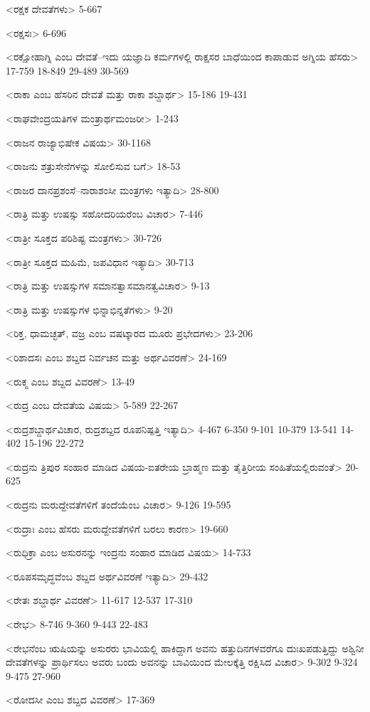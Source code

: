 <ರಕ್ಷಕ ದೇವತೆಗಳು>
5-667

<ರಕ್ಷಸಃ>
6-696

<ರಕ್ಷೋಹಾಗ್ನಿ ಎಂಬ ದೇವತೆ–ಇದು ಯಜ್ಞಾದಿ ಕರ್ಮಗಳಲ್ಲಿ ರಾಕ್ಷಸರ ಬಾಧೆಯಿಂದ ಕಾಪಾಡುವ ಅಗ್ನಿಯ ಹೆಸರು>
17-759 
18-849
29-489
30-569

<ರಾಕಾ ಎಂಬ ಹೆಸರಿನ ದೇವತೆ ಮತ್ತು ರಾಕಾ ಶಬ್ದಾರ್ಥ>
15-186
19-431

<ರಾಘವೇಂದ್ರಯತಿಗಳ ಮಂತ್ರಾರ್ಥಮಂಜರೀ>
1-243

<ರಾಜನ ರಾಜ್ಯಾಭಿಷೇಕ ವಿಷಯ>
30-1168

<ರಾಜನು ಶತ್ರುಸೇನೆಗಳನ್ನು ಸೋಲಿಸುವ ಬಗೆ>
18-53

<ರಾಜರ ದಾನಪ್ರಶಂಸೆ–ನಾರಾಶಂಸೀ ಮಂತ್ರಗಳು ಇತ್ಯಾದಿ>
28-800

<ರಾತ್ರಿ ಮತ್ತು ಉಷಸ್ಸು ಸಹೋದರಿಯರೆಂಬ ವಿಚಾರ>
7-446

<ರಾತ್ರೀ ಸೂಕ್ತದ ಪರಿಶಿಷ್ಟ ಮಂತ್ರಗಳು>
30-726

<ರಾತ್ರೀ ಸೂಕ್ತದ ಮಹಿಮೆ, ಜಪವಿಧಾನ ಇತ್ಯಾದಿ>
30-713

<ರಾತ್ರಿ ಮತ್ತು ಉಷಸ್ಸುಗಳ ಸಮಾನತ್ವಾಸಮಾನತ್ವವಿಚಾರ>
9-13

<ರಾತ್ರಿ ಮತ್ತು ಉಷಸ್ಸುಗಳ ಭಿನ್ನಾಭಿನ್ನತೆಗಳು>
9-20

<ರಿಕ್ತ, ಧಾಮಚ್ಛತ್‍, ವಜ್ರ ಎಂಬ ವಷಟ್ಕಾರದ ಮೂರು ಪ್ರಭೇದಗಳು>
23-206

<ರಿಶಾದಸಃ ಎಂಬ ಶಬ್ದದ ನಿರ್ವಚನ ಮತ್ತು ಅರ್ಥವಿವರಣೆ>
24-169

<ರುಕ್ಮ ಎಂಬ ಶಬ್ದದ ವಿವರಣೆ>
13-49

<ರುದ್ರ ಎಂಬ ದೇವತೆಯ ವಿಷಯ>
5-589
22-267

<ರುದ್ರಶಬ್ದಾರ್ಥವಿಚಾರ, ರುದ್ರಶಬ್ದದ ರೂಪನಿಷ್ಪತ್ತಿ ಇತ್ಯಾದಿ>
4-467
6-350 
9-101
10-379
13-541 
14-402 
15-196
22-272

<ರುದ್ರನು ತ್ರಿಪುರ ಸಂಹಾರ ಮಾಡಿದ ವಿಷಯ-ಐತರೇಯ ಬ್ರಾಹ್ಮಣ ಮತ್ತು ತೈತ್ತಿರೀಯ ಸಂಹಿತೆಯಲ್ಲಿರುವಂತೆ>
20-625


<ರುದ್ರನು ಮರುದ್ದೇವತೆಗಳಿಗೆ ತಂದೆಯೆಂಬ ವಿಚಾರ>
9-126
19-595

<ರುದ್ರಾಃ ಎಂಬ ಹೆಸರು ಮರುದ್ದೇವತೆಗಳಿಗೆ ಬರಲು ಕಾರಣ>
19-660

<ರುಧಿಕ್ರಾ ಎಂಬ ಅಸುರನನ್ನು ಇಂದ್ರನು ಸಂಹಾರ ಮಾಡಿದ ವಿಷಯ>
14-733

<ರೂಪಸಮೃದ್ಧವೆಂಬ ಶಬ್ದದ ಅರ್ಥವಿವರಣೆ ಇತ್ಯಾದಿ>
29-432

<ರೇತಃ ಶಬ್ದಾರ್ಥ ವಿವರಣೆ>
11-617 
12-537
17-310

<ರೇಭ>
8-746
9-360
9-443
22-483

<ರೇಭನೆಂಬ ಋಷಿಯನ್ನು ಅಸುರರು ಭಾವಿಯಲ್ಲಿ ಹಾಕಿದ್ದಾಗ ಅವನು ಹತ್ತುದಿನಗಳವರೆಗೂ ದುಃಖಪಡುತ್ತಿದ್ದು ಅಶ್ವಿನೀ ದೇವತೆಗಳನ್ನು ಪ್ರಾರ್ಥಿಸಲು ಅವರು ಬಂದು ಅವನನ್ನು ಬಾವಿಯಿಂದ ಮೇಲಕ್ಕೆತ್ತಿ ರಕ್ಷಿಸಿದ ವಿಚಾರ>
9-302 
9-324
9-475
27-960

<ರೋದಸೀ ಎಂಬ ಶಬ್ದದ ವಿವರಣೆ>
17-369

